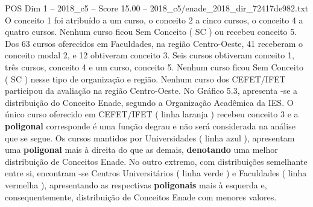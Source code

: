 \begin{textsample}{POS Dim 1 – 2018\_c5 – Score 15.00 – 2018\_c5/enade\_2018\_dir\_72417de982.txt}
O conceito 1 foi atribuído a um curso, o conceito 2 a cinco cursos, o conceito 4 a quatro cursos.
Nenhum curso ficou Sem Conceito ( SC ) ou recebeu conceito 5.
Dos 63 cursos oferecidos em Faculdades, na região Centro-Oeste, 41 receberam o conceito modal 2, e 12 obtiveram conceito 3.
Seis cursos obtiveram conceito 1, três cursos, conceito 4 e um curso, conceito 5.
Nenhum curso ficou Sem Conceito ( SC ) nesse tipo de organização e região.
Nenhum curso dos CEFET/IFET participou da avaliação na região Centro-Oeste.
No Gráfico 5.3, apresenta -se a distribuição do Conceito Enade, segundo a Organização Acadêmica da IES.
O único curso oferecido em CEFET/IFET ( linha laranja ) recebeu conceito 3 e a \textbf{poligonal} corresponde é uma função degrau e não será considerada na análise que se segue.
Os cursos mantidos por Universidades ( linha azul ), apresentam uma \textbf{poligonal} mais à direita do que as demais, \textbf{denotando} uma melhor distribuição de Conceitos Enade.
No outro extremo, com distribuições semelhante entre si, encontram -se Centros Universitários ( linha verde ) e Faculdades ( linha vermelha ), apresentando as respectivas \textbf{poligonais} mais à esquerda e, consequentemente, distribuição de Conceitos Enade com menores valores.

\end{textsample}
